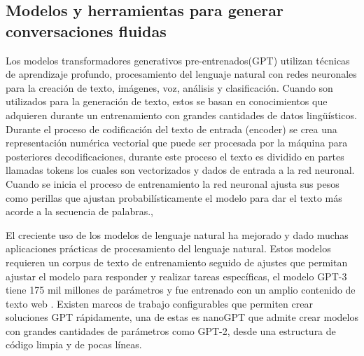 \subsection{Modelos y herramientas para generar conversaciones fluidas}\label{section: Modelos y herramientas}
Los modelos transformadores generativos pre-entrenados(GPT) utilizan técnicas de aprendizaje profundo, procesamiento del lenguaje natural con redes neuronales   para la creación de texto, imágenes, voz, análisis y clasificación. Cuando son utilizados para la generación de texto, estos se basan en conocimientos que adquieren durante un entrenamiento con grandes cantidades de datos lingüísticos. 
Durante el proceso de codificación del texto de entrada (encoder) se crea una representación numérica vectorial que puede ser procesada por la máquina para posteriores decodificaciones, durante este proceso el texto es dividido en partes llamadas tokens los cuales son vectorizados y dados de entrada a la red neuronal.
Cuando se inicia el proceso de entrenamiento la red neuronal ajusta sus pesos como perillas que ajustan probabilísticamente el modelo para dar el texto más acorde a la secuencia de palabras.\cite{Alex2023}, \cite{AWS2022}

El creciente uso de los modelos de lenguaje natural ha mejorado y dado muchas aplicaciones prácticas de procesamiento del lenguaje natural. Estos modelos requieren un corpus de texto de entrenamiento seguido de ajustes que permitan ajustar el modelo para responder y realizar tareas específicas, el modelo GPT-3 tiene 175 mil millones de parámetros y fue entrenado con un amplio contenido de texto web \cite{Brown2020}. 
Existen marcos de trabajo configurables que permiten crear soluciones GPT rápidamente, una de estas es nanoGPT que admite crear modelos con grandes cantidades de parámetros como GPT-2, desde una estructura de código limpia y de pocas líneas. 
